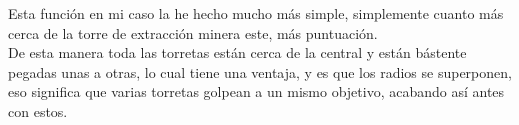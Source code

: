 Esta función en mi caso la he hecho mucho más simple, simplemente cuanto más cerca de la torre de extracción minera este, más puntuación.\\
De esta manera toda las torretas están cerca de la central y están bástente pegadas unas a otras, lo cual tiene una ventaja, y es que los radios se superponen, eso significa que varias torretas golpean a un mismo objetivo, acabando así antes con estos.